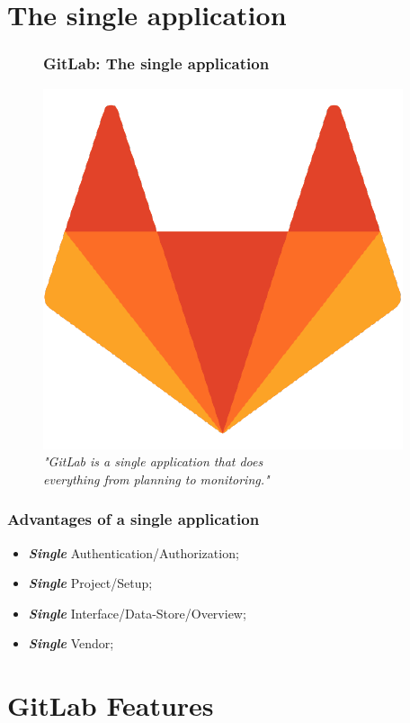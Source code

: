 \documentclass[notes]{beamer}
\begin{document}
\section{The single application}

\begin{frame}
  \begin{figure}
    \frametitle{GitLab: The single application}
    \centering
    \includegraphics[scale=0.3]{gitlab.png}\\
    \textit{"GitLab is a single application that does} \\
    \textit{everything from planning to monitoring."}
  \end{figure}
\end{frame}

\begin{frame}
  \frametitle{Advantages of a single application}
  \begin{itemize}[<+->]
  \item \textbf{\textit{Single}} Authentication/Authorization;
  \item \textbf{\textit{Single}} Project/Setup;
  \item \textbf{\textit{Single}} Interface/Data-Store/Overview;
  \item \textbf{\textit{Single}} Vendor;
  \end{itemize}
\end{frame}

\section{GitLab Features}
\end{document}
